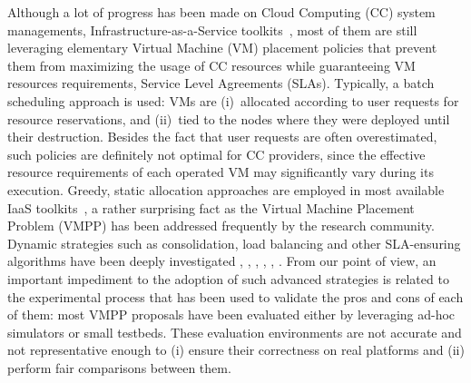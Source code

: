 \documentclass[conference]{IEEEtran}
\begin{document}
Although a lot of progress has been made on Cloud Computing (CC)
system managements, \aka Infrastructure-as-a-Service
toolkits~\cite{moreno:2012}, most of them are still leveraging
elementary Virtual Machine (VM) placement policies that prevent them
from maximizing the usage of CC resources while guaranteeing VM
resources requirements, \aka Service Level Agreements (SLAs).
Typically, a batch scheduling approach is used: VMs are (i)~allocated
according to user requests for resource reservations, and (ii)~tied to
the nodes where they were deployed until their destruction. Besides
the fact that user requests are often overestimated, such policies are
definitely not optimal for CC providers, since the effective resource
requirements of each operated VM may significantly vary during its
execution.
Greedy, static allocation approaches are employed in most available
IaaS toolkits~\cite{openstack, opennebula, cloudstack}, a rather
surprising fact as the Virtual Machine Placement Problem (VMPP) has
been addressed frequently by the research community. Dynamic
strategies such as consolidation, load balancing and other
SLA-ensuring algorithms have been deeply investigated
\cite{Hermenier:2009:ECM:1508293.1508300}, \cite{feller:ccgrid12},
\cite{quesnel:cpe2012}, \cite{5935254}, \cite{5715067},
\cite{5328077}.
From our point of view, an important impediment to the adoption of
such advanced strategies is related to the experimental process that
has been used to validate the pros and cons of each of them: most VMPP
proposals have been evaluated either by leveraging ad-hoc simulators
or small testbeds. These evaluation environments are not accurate and not
representative enough to (i) ensure their correctness on real
platforms and (ii) perform fair comparisons between them.
\end{document}
